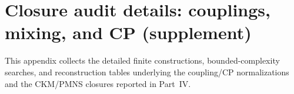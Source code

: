 \section{Closure audit details: couplings, mixing, and CP (supplement)}
\label{app:closure_audit_details}

This appendix collects the detailed finite constructions, bounded-complexity searches, and reconstruction tables underlying the coupling/CP normalizations and the CKM/PMNS closures reported in Part~IV.





